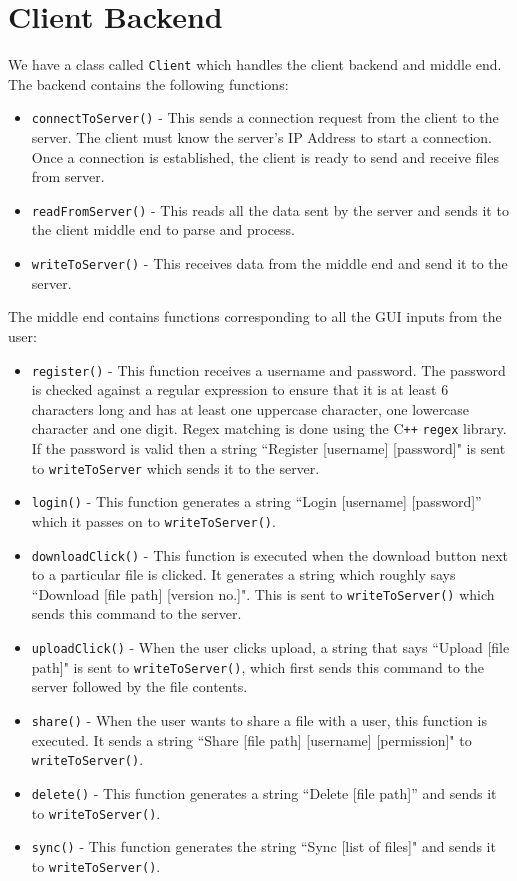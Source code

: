 \documentclass[]{article}
\newcommand{\ty}[1]{\texttt{#1}}
\begin{document}
\section{Client Backend}
We have a class called \ty{Client} which handles the client backend and middle end.
The backend contains the following functions: 
\begin{itemize}
\item \ty{connectToServer()} - This sends a connection request from the client to the server. The client must know the server's IP Address to start a connection. Once a connection is established, the client is ready to send and receive files from server.
\item \ty{readFromServer()} - This reads all the data sent by the server and sends it to the client middle end to parse and process.
\item \ty{writeToServer()} - This receives data from the middle end and send it to the server.  
\end{itemize}
The middle end contains functions corresponding to all the GUI inputs from the user:
\begin{itemize}
\item \ty{register()} - This function receives a username and password. The password is checked against a regular expression to ensure that it is at least 6 characters long and has at least one uppercase character, one lowercase character and one digit. Regex matching is done using the C{}\verb!++! \ty{regex} library. If the password is valid then a string ``Register [username] [password]" is sent to \ty{writeToServer} which sends it to the server.
\item \ty{login()} - This function generates a string ``Login [username] [password]'' which it passes on to \ty{writeToServer()}.
\item \ty{downloadClick()} - This function is executed when the download button next to a particular file is clicked. It generates a string which roughly says ``Download [file path] [version no.]". This is sent to \ty{writeToServer()} which sends this command to the server.
\item \ty{uploadClick()} - When the user clicks upload, a string that says ``Upload [file path]" is sent to \ty{writeToServer()}, which first sends this command to the server followed by the file contents.
\item \ty{share()} - When the user wants to share a file with a user, this function is executed. It sends a string ``Share [file path] [username] [permission]" to \ty{writeToServer()}.
\item \ty{delete()} - This function generates a string ``Delete [file path]'' and sends it to \ty{writeToServer()}.
\item \ty{sync()} - This function generates the string ``Sync [list of files]" and sends it to \ty{writeToServer()}.
\end{itemize}
\end{document}
